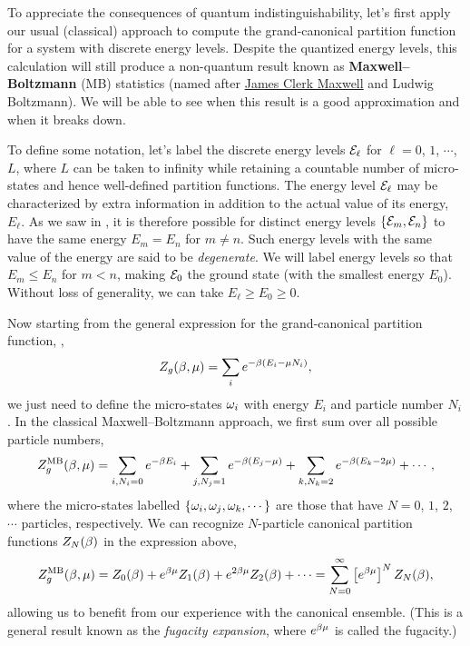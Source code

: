 To appreciate the consequences of quantum indistinguishability, let's first apply our usual (classical) approach to compute the grand-canonical partition function for a system with discrete energy levels.
Despite the quantized energy levels, this calculation will still produce a non-quantum result known as \textbf{Maxwell--Boltzmann} (MB) statistics (named after \href{https://en.wikipedia.org/wiki/James_Clerk_Maxwell}{James Clerk Maxwell} and Ludwig Boltzmann).
We will be able to see when this result is a good approximation and when it breaks down.

To define some notation, let's label the discrete energy levels $\mathcal E_{\ell}$ for $\ell = 0$, $1$, $\cdots$, $L$, where $L$ can be taken to infinity while retaining a countable number of micro-states and hence well-defined partition functions.
The energy level $\mathcal E_{\ell}$ may be characterized by extra information in addition to the actual value of its energy, $E_{\ell}$.
As we saw in , it is therefore possible for distinct energy levels $\left\{\mathcal E_m, \mathcal E_n\right\}$ to have the same energy $E_m = E_n$ for $m \neq n$.
Such energy levels with the same value of the energy are said to be \textit{degenerate}.
We will label energy levels so that $E_m \leq E_n$ for $m < n$, making $\mathcal E_0$ the ground state (with the smallest energy $E_0$).
Without loss of generality, we can take $E_{\ell} \geq E_0 \geq 0$.

Now starting from the general expression for the grand-canonical partition function, ,
\begin{equation*}
  Z_g(\beta, \mu) = \sum_i e^{-\beta (E_i - \mu N_i)},
\end{equation*}
we just need to define the micro-states $\omega_i$ with energy $E_i$ and particle number $N_i$.
In the classical Maxwell--Boltzmann approach, we first sum over all possible particle numbers,
\begin{equation*}
  Z_g^{\text{MB}}(\beta, \mu) = \sum_{i, N_i = 0} e^{-\beta E_i} + \sum_{j, N_j = 1} e^{-\beta (E_j - \mu)} + \sum_{k, N_k = 2} e^{-\beta (E_k - 2\mu)} + \cdots,
\end{equation*}
where the micro-states labelled $\left\{\omega_i, \omega_j, \omega_k, \cdots\right\}$ are those that have $N = 0$, $1$, $2$, $\cdots$ particles, respectively.
We can recognize $N$-particle canonical partition functions $Z_N(\beta)$ in the expression above,
\begin{equation}
  \label{eq:fugacity_exp}
  Z_g^{\text{MB}}(\beta, \mu) = Z_0(\beta) + e^{\beta\mu} Z_1(\beta) + e^{2\beta\mu} Z_2(\beta) + \cdots = \sum_{N = 0}^{\infty} \left[e^{\beta\mu}\right]^N Z_N(\beta),
\end{equation}
allowing us to benefit from our experience with the canonical ensemble.
(This is a general result known as the \textit{fugacity expansion}, where $e^{\beta\mu}$ is called the fugacity.)

